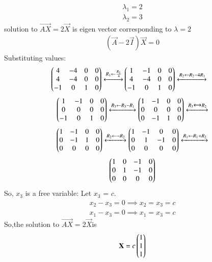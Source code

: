\begin{align}
 \lambda_1=2\\
 \lambda_2=3
 \end{align}
solution to $\vec{AX} =2\vec{X}$ is eigen vector corresponding to $\lambda=2$
\begin{align}
    (\vec{A}-2\vec{I})\vec X=0
\end{align}
Substituting values:
\begin{align}
\begin{pmatrix}4& -4&0&0\\
4 & -4 & 0&0\\
-1 & 0 &1&0
\end{pmatrix}
\xleftrightarrow[]{R_1 \leftarrow \frac{R_1}{4}} 
&
\begin{pmatrix}1&-1&0&0\\
4&-4&0&0\\
-1&0&1&0\end{pmatrix}
\xleftrightarrow[]{R_2 \leftarrow R_2-4R_1 } \nonumber 
\end{align}
\begin{align}
    \begin{pmatrix}1&-1&0&0\\
            0&0&0&0\\
            -1&0&1&0\end{pmatrix}
    \xleftrightarrow[]{R_3 \leftarrow R_3-R_1 }
    \begin{pmatrix}1&-1&0&0\\
            0&0&0&0\\
            0&-1&1&0\end{pmatrix}
    \xleftrightarrow[]{R_3 \xleftrightarrow[]{} R_2 } \nonumber
\end{align}
\begin{align}
    \begin{pmatrix}1&-1&0&0\\
    0&-1&1&0\\
    0&0&0&0\end{pmatrix}
    \xleftrightarrow[]{R_2 \leftarrow -R_2} 
    \begin{pmatrix}1&-1&0&0\\
    0&1&-1&0\\
    0&0&0&0\end{pmatrix}   
    \xleftrightarrow[]{R_1 \leftarrow R_1+R_2} \nonumber
\end{align}
\begin{align} \label{eq:solutions/1/2/3/eq:eq_5}
    \begin{pmatrix}1&0&-1&0\\
    0&1&-1&0\\
    0&0&0&0\end{pmatrix} 
\end{align}
So, $x_3$ is a free variable: Let $x_3$ = $c$. 
\begin{align}
 {x_2}-{x_3}=0 \implies{x_2}={x_3}=c \\
 {x_1}-{x_3}=0 \implies{x_1}={x_3}=c 
 \end{align}
 So,the solution to $\vec{AX} =2\vec{X}$is
 \begin{align}\label{eq:solutions/1/2/3/eq:555}
 \mathbf{X} = 
 c
 \begin{pmatrix}
 1\\1\\1
 \end{pmatrix}
\end{align}
